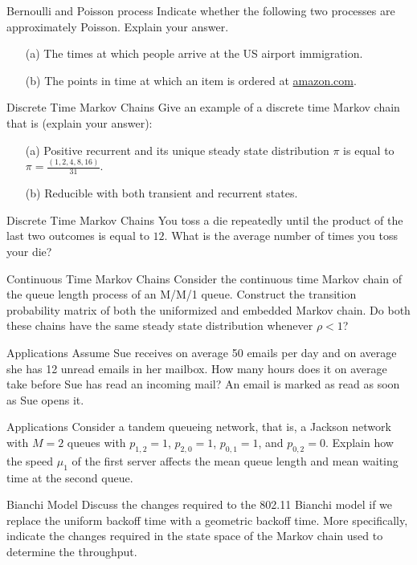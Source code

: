 \begin{problem}{Bernoulli and Poisson process} 
Indicate whether the following two processes are approximately Poisson. Explain your answer.
\begin{itemize}
\item[(a)] The times at which people arrive at the US airport immigration.
\item[(b)] The points in time at which an item is ordered at \url{amazon.com}.
\end{itemize}
\end{problem}

\begin{problem}{Discrete Time Markov Chains}
Give an example of a discrete time Markov chain that is (explain your answer):
\begin{itemize}
    \item[(a)] Positive recurrent and its unique steady state distribution $\pi$ is equal to $\pi = \frac{(1, 2, 4, 8, 16)}{31}$.
    \item[(b)] Reducible with both transient and recurrent states.
\end{itemize}
\end{problem}

\begin{problem}{Discrete Time Markov Chains}
You toss a die repeatedly until the product of the last two outcomes is equal to $12$. What is the average number of times you toss your die?
\end{problem}

\begin{problem}{Continuous Time Markov Chains}
Consider the continuous time Markov chain of the queue length process of an M/M/1 queue. Construct the transition probability matrix of both the uniformized and embedded Markov chain. Do both these chains have the same steady state distribution whenever $\rho < 1$?
\end{problem}

\begin{problem}{Applications}
Assume Sue receives on average 50 emails per day and on average she has 12 unread emails in her mailbox. How many hours does it on average take before Sue has read an incoming mail? An email is marked as read as soon as Sue opens it.
\end{problem}

\begin{problem}{Applications}
Consider a tandem queueing network, that is, a Jackson network with $M = 2$ queues with $p_{1,2} = 1$, $p_{2,0} = 1$, $p_{0,1} = 1$, and $p_{0,2} = 0$. Explain how the speed $\mu_1$ of the first server affects the mean queue length and mean waiting time at the second queue.
\end{problem}

\begin{problem}{Bianchi Model}
Discuss the changes required to the 802.11 Bianchi model if we replace the uniform backoff time with a geometric backoff time. More specifically, indicate the changes required in the state space of the Markov chain used to determine the throughput.
\end{problem}
